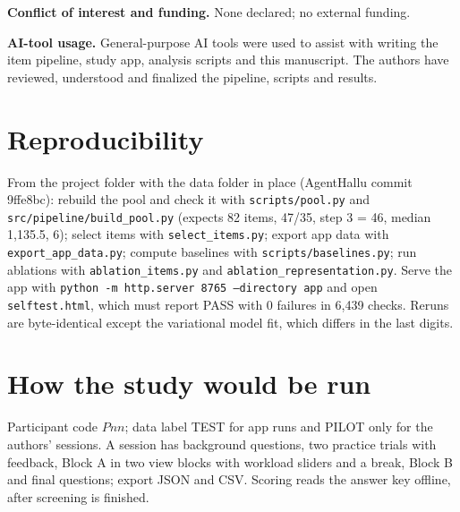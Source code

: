 \documentclass[conference]{IEEEtran}
\begin{document}
\textbf{Conflict of interest and funding.} None declared; no external funding.

\textbf{AI-tool usage.} General-purpose AI tools were used to assist with writing the item pipeline, study app, analysis scripts and this manuscript. The authors have reviewed, understood and finalized the pipeline, scripts and results.




\appendices
\section{Reproducibility}
From the project folder with the data folder in place (AgentHallu commit 9ffe8bc): rebuild the pool and check it with \texttt{scripts/pool.py} and \texttt{src/pipeline/build\_pool.py} (expects 82 items, 47/35, step 3 = 46, median 1,135.5, 6); select items with \texttt{select\_items.py}; export app data with \texttt{export\_app\_data.py}; compute baselines with \texttt{scripts/baselines.py}; run ablations with \texttt{ablation\_items.py} and \texttt{ablation\_representation.py}. Serve the app with \texttt{python -m http.server 8765 --directory app} and open \texttt{selftest.html}, which must report PASS with 0 failures in 6,439 checks. Reruns are byte-identical except the variational model fit, which differs in the last digits.

\section{How the study would be run}
Participant code $Pnn$; data label TEST for app runs and PILOT only for the authors' sessions. A session has background questions, two practice trials with feedback, Block A in two view blocks with workload sliders and a break, Block B and final questions; export JSON and CSV. Scoring reads the answer key offline, after screening is finished.
\end{document}
